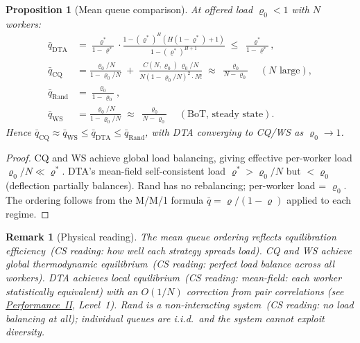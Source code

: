 \documentclass[11pt,a4paper]{report}
\newtheorem{proposition}[theorem]{Proposition}
\newtheorem{remark}{Remark}[section]
\newcommand{\physics}[2]{#1\ \textnormal{(\emph{CS reading}: #2)}}
\begin{document}
\begin{proposition}[Mean queue comparison]\label{prop:mean_queue}
At offered load $\varrho_0 < 1$ with $N$ workers:
\begin{align}
  \bar q_{\mathrm{DTA}} &= \frac{\varrho^*}{1-\varrho^*}
     \cdot \frac{1 - (\varrho^*)^H (H(1-\varrho^*)+1)}{1 - (\varrho^*)^{H+1}}
     \;\le\; \frac{\varrho^*}{1-\varrho^*}, \label{eq:q_dta}\\
  \bar q_{\mathrm{CQ}} &= \frac{\varrho_0/N}{1 - \varrho_0/N}
     \;+\; \frac{C(N,\varrho_0)\,\varrho_0/N}{N(1-\varrho_0/N)^2 \cdot N!}
     \;\approx\; \frac{\varrho_0}{N - \varrho_0}\quad(N \text{ large}), \label{eq:q_cq}\\
  \bar q_{\mathrm{Rand}} &= \frac{\varrho_0}{1 - \varrho_0}, \label{eq:q_rand}\\
  \bar q_{\mathrm{WS}} &= \frac{\varrho_0/N}{1-\varrho_0/N}
     \;\approx\; \frac{\varrho_0}{N - \varrho_0}
     \quad(\text{BoT, steady state}). \label{eq:q_ws}
\end{align}
Hence $\bar q_{\mathrm{CQ}} \approx \bar q_{\mathrm{WS}} \le \bar q_{\mathrm{DTA}} \le \bar q_{\mathrm{Rand}}$,
with DTA converging to CQ/WS as $\varrho_0 \to 1$.
\end{proposition}

\begin{proof}
CQ and WS achieve global load balancing, giving effective per-worker load
$\varrho_0/N \ll \varrho^*$.  DTA's mean-field self-consistent load
$\varrho^* > \varrho_0/N$ but $< \varrho_0$ (deflection partially balances).
Rand has no rebalancing; per-worker load = $\varrho_0$.  The ordering follows
from the M/M/1 formula $\bar q = \varrho/(1-\varrho)$ applied to each regime.
\end{proof}

\begin{remark}[Physical reading]
The mean queue ordering reflects
\physics{equilibration efficiency}{how well each strategy spreads load}.
CQ and WS achieve \physics{global thermodynamic equilibrium}
{perfect load balance across all workers}.
DTA achieves \physics{local equilibrium}{mean-field: each worker
statistically equivalent} with an $O(1/N)$ correction from pair correlations
(see \hyperref[chap:kinetic_theory]{Performance~II}, Level~1).
Rand is a \physics{non-interacting system}{no load balancing at all};
individual queues are i.i.d.\ and the system cannot exploit diversity.
\end{remark}

\end{document}
